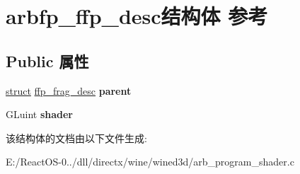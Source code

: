 \hypertarget{structarbfp__ffp__desc}{}\section{arbfp\+\_\+ffp\+\_\+desc结构体 参考}
\label{structarbfp__ffp__desc}
\subsection*{Public 属性}
\begin{DoxyCompactItemize}
\item 
\mbox{\label{structarbfp__ffp__desc_aedacbc46282b2abc2e4690ba54cfd92d}} 
\hyperlink{interfacestruct}{struct} \hyperlink{structffp__frag__desc}{ffp\+\_\+frag\+\_\+desc} {\bfseries parent}
\item 
\mbox{\label{structarbfp__ffp__desc_adab7b1a9808c1d06ef07f0aba49751da}} 
G\+Luint {\bfseries shader}
\end{DoxyCompactItemize}


该结构体的文档由以下文件生成\+:\begin{DoxyCompactItemize}
\item 
E\+:/\+React\+O\+S-\/0../dll/directx/wine/wined3d/arb\+\_\+program\+\_\+shader.\+c\end{DoxyCompactItemize}
